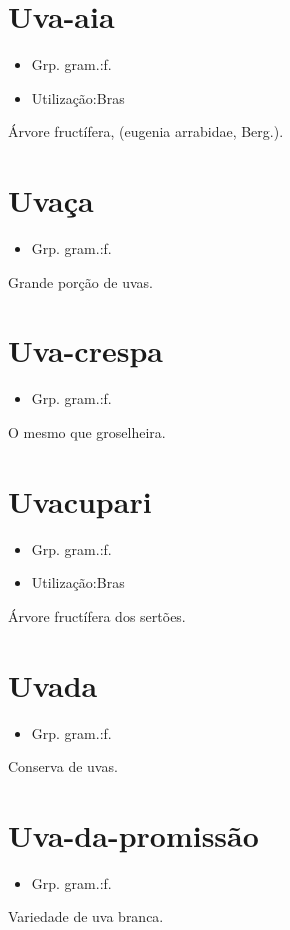 \documentclass{article}
\begin{document}
\section{Uva-aia}
\begin{itemize}
\item {Grp. gram.:f.}
\end{itemize}
\begin{itemize}
\item {Utilização:Bras}
\end{itemize}
Árvore fructífera, (\textunderscore eugenia arrabidae\textunderscore , Berg.).
\section{Uvaça}
\begin{itemize}
\item {Grp. gram.:f.}
\end{itemize}
Grande porção de uvas.
\section{Uva-crespa}
\begin{itemize}
\item {Grp. gram.:f.}
\end{itemize}
O mesmo que \textunderscore groselheira\textunderscore .
\section{Uvacupari}
\begin{itemize}
\item {Grp. gram.:f.}
\end{itemize}
\begin{itemize}
\item {Utilização:Bras}
\end{itemize}
Árvore fructífera dos sertões.
\section{Uvada}
\begin{itemize}
\item {Grp. gram.:f.}
\end{itemize}
Conserva de uvas.
\section{Uva-da-promissão}
\begin{itemize}
\item {Grp. gram.:f.}
\end{itemize}
Variedade de uva branca.
\end{document}
